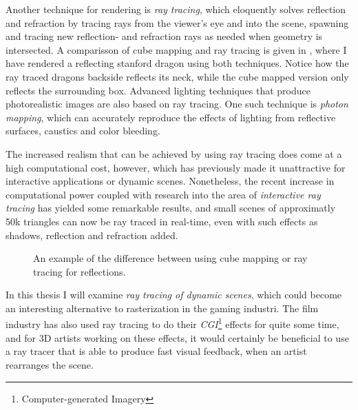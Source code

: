 Another technique for rendering is \textit{ray tracing}, which eloquently solves
reflection and refraction by tracing rays from the viewer's eye and into the
scene, spawning and tracing new reflection- and refraction rays as needed when
geometry is intersected. A comparisson of cube mapping and ray tracing is given
in , where I have rendered a reflecting stanford
dragon using both techniques. Notice how the ray traced dragons backside
reflects its neck, while the cube mapped version only reflects the surrounding
box. Advanced lighting techniques that produce photorealistic images are also
based on ray tracing. One such technique is \textit{photon mapping}, which can
accurately reproduce the effects of lighting from reflective surfaces, caustics
and color bleeding.



The increased realism that can be achieved by using ray tracing does come at a
high computational cost, however, which has previously made it unattractive for
interactive applications or dynamic scenes. Nonetheless, the recent increase in
computational power coupled with research into the area of \textit{interactive
  ray tracing} has yielded some remarkable results, and small scenes of
approximatly 50k triangles can now be ray traced in real-time, even with such
effects as shadows, reflection and refraction added.

\begin{figure}
  \centering
  \hspace{10pt}
  \caption[Reflections created with cube mapping and ray tracing.]{An example of
    the difference between using cube mapping or ray tracing for
    reflections.}
  \label{fig:reflectingDragons}
\end{figure}



In this thesis I will examine \textit{ray tracing of dynamic scenes}, which
could become an interesting alternative to rasterization in the gaming industri.
The film industry has also used ray tracing to do their
\textit{CGI}\footnote{Computer-generated Imagery} effects for quite some time,
and for 3D artists working on these effects, it would certainly be beneficial to
use a ray tracer that is able to produce fast visual feedback, when an artist
rearranges the scene.

